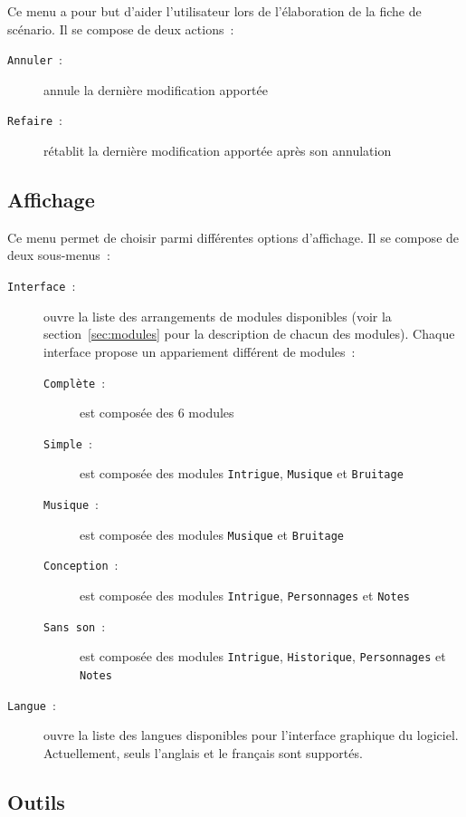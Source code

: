 \documentclass[a4paper,12pt]{article}
\newcommand*{\interfaceitem}[1]{\texttt{#1}}
\begin{document}
Ce menu a pour but d'aider l'utilisateur lors de l'élaboration de la fiche de scénario.
Il se compose de deux actions~:
\begin{description}
    \item[\interfaceitem{Annuler}~:]{annule la dernière modification apportée}
    \item[\interfaceitem{Refaire}~:]{rétablit la dernière modification apportée après son annulation}
\end{description}

\subsection{Affichage}
\label{sec:affich}

Ce menu permet de choisir parmi différentes options d'affichage.
Il se compose de deux sous-menus~:
\begin{description}
    \item[\interfaceitem{Interface}~:]{ouvre la liste des arrangements de modules disponibles (voir la section~\ref{sec:modules} pour la description de chacun des modules).
        Chaque interface propose un appariement différent de modules~:
        \begin{description}
            \item[\interfaceitem{Complète}~:]{est composée des 6 modules}
            \item[\interfaceitem{Simple}~:]{est composée des modules \interfaceitem{Intrigue}, \interfaceitem{Musique} et \interfaceitem{Bruitage}}
            \item[\interfaceitem{Musique}~:]{est composée des modules \interfaceitem{Musique} et \interfaceitem{Bruitage}}
            \item[\interfaceitem{Conception}~:]{est composée des modules \interfaceitem{Intrigue}, \interfaceitem{Personnages} et \interfaceitem{Notes}}
            \item[\interfaceitem{Sans son}~:]{est composée des modules \interfaceitem{Intrigue}, \interfaceitem{Historique}, \interfaceitem{Personnages} et \interfaceitem{Notes}}
        \end{description}
    }
    \item[\interfaceitem{Langue}~:]{ouvre la liste des langues disponibles pour l'interface graphique du logiciel.
        Actuellement, seuls l'anglais et le français sont supportés.}
\end{description}

\subsection{Outils}
\label{sec:menu_outils}
\end{document}
